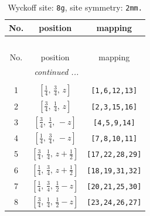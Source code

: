 \documentclass[fleqn,8pt]{jsarticle}
\begin{document}
\renewcommand{\arraystretch}{1.2}
\begin{longtable}{ccc}
\caption{Wyckoff site: {\tt 8g}, site symmetry: {\tt 2mm.}}
 \\
 \hline \hline
No. & position & mapping \\ \hline \endfirsthead

\multicolumn{2}{l}{\tablename\ \thetable{}} \\
 \hline \hline
No. & position & mapping \\ \hline \endhead

 \hline \hline
\multicolumn{2}{r}{\footnotesize\it continued ...} \\ \endfoot

 \hline \hline
\multicolumn{2}{r}{} \\ \endlastfoot

1 & $\left[ \frac{1}{4},\, \frac{3}{4},\, z \right]$ & {\tt [1,6,12,13]} \\ \hline
2 & $\left[ \frac{3}{4},\, \frac{1}{4},\, z \right]$ & {\tt [2,3,15,16]} \\ \hline
3 & $\left[ \frac{3}{4},\, \frac{1}{4},\, - z \right]$ & {\tt [4,5,9,14]} \\ \hline
4 & $\left[ \frac{1}{4},\, \frac{3}{4},\, - z \right]$ & {\tt [7,8,10,11]} \\ \hline
5 & $\left[ \frac{3}{4},\, \frac{1}{4},\, z + \frac{1}{2} \right]$ & {\tt [17,22,28,29]} \\ \hline
6 & $\left[ \frac{1}{4},\, \frac{3}{4},\, z + \frac{1}{2} \right]$ & {\tt [18,19,31,32]} \\ \hline
7 & $\left[ \frac{1}{4},\, \frac{3}{4},\, \frac{1}{2} - z \right]$ & {\tt [20,21,25,30]} \\ \hline
8 & $\left[ \frac{3}{4},\, \frac{1}{4},\, \frac{1}{2} - z \right]$ & {\tt [23,24,26,27]} \\
\end{longtable}
\renewcommand{\arraystretch}{1.2}
\end{document}
